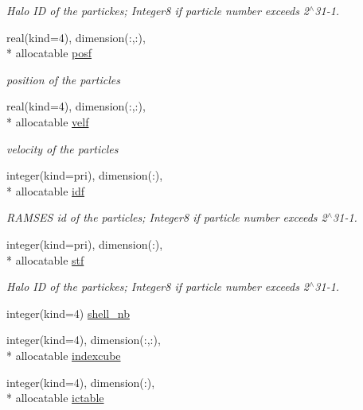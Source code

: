 \begin{DoxyCompactItemize}
\begin{DoxyCompactList}\small\item\em Halo I\-D of the partickes; Integer8 if particle number exceeds 2$^\wedge$31-\/1. \end{DoxyCompactList}\item 
real(kind=4), dimension(\-:,\-:), \\*
allocatable \hyperlink{classmodvariables_a7528c234a190760e036921b956ec9fe8}{posf}
\begin{DoxyCompactList}\small\item\em position of the particles \end{DoxyCompactList}\item 
real(kind=4), dimension(\-:,\-:), \\*
allocatable \hyperlink{classmodvariables_a99c2bd91d22daa7bfaa3491624db7f14}{velf}
\begin{DoxyCompactList}\small\item\em velocity of the particles \end{DoxyCompactList}\item 
integer(kind=pri), dimension(\-:), \\*
allocatable \hyperlink{classmodvariables_a74cd7fb485e34ae685664db5b2629aa9}{idf}
\begin{DoxyCompactList}\small\item\em R\-A\-M\-S\-E\-S id of the particles; Integer8 if particle number exceeds 2$^\wedge$31-\/1. \end{DoxyCompactList}\item 
integer(kind=pri), dimension(\-:), \\*
allocatable \hyperlink{classmodvariables_a5b99e0cc82073c06969e0fe6caa06357}{stf}
\begin{DoxyCompactList}\small\item\em Halo I\-D of the partickes; Integer8 if particle number exceeds 2$^\wedge$31-\/1. \end{DoxyCompactList}\item 
integer(kind=4) \hyperlink{classmodvariables_a8e749d6e70dade5cb6d75a09a99cefd7}{shell\-\_\-nb}
\item 
integer(kind=4), dimension(\-:,\-:), \\*
allocatable \hyperlink{classmodvariables_a46e17f78883958892917ac536b4ab1b1}{indexcube}
\item 
integer(kind=4), dimension(\-:), \\*
allocatable \hyperlink{classmodvariables_a2de620524061386e6addabfa15a6b020}{ictable}
\item 

\end{DoxyCompactItemize}
